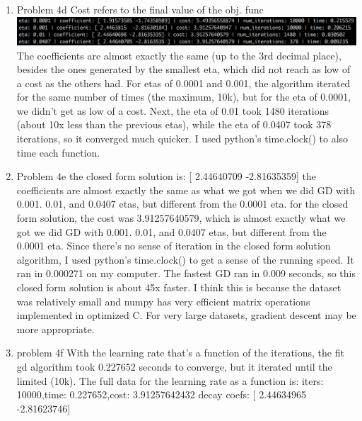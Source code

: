 \documentclass[11pt]{article}
\newcommand{\solution}[1]{{{\color{blue}{\bf Solution:} {#1}}}}
\begin{document}
\begin{enumerate}
\item Problem 4d \newline{} Cost refers to the final value of the obj. func \newline{}
\includegraphics[scale=0.55]{PS22Real.png}
\solution{The coefficients are almost exactly the same (up to the 3rd decimal place), besides the ones generated by the smallest eta, which did not reach as low of a cost as the others had. For etas of 0.0001 and 0.001, the algorithm iterated for the same number of times (the maximum, 10k), but for the eta of 0.0001, we didn't get as low of a cost. Next, the eta of 0.01 took 1480 iterations (about 10x less than the previous etas), while the eta of 0.0407 took 378 iterations, so it converged much quicker. I used python's time.clock() to also time each function.}
\vspace{1cm}
\item Problem 4e \newline{}
\solution{
the closed form solution is: [ 2.44640709 -2.81635359]
the coefficients are almost exactly the same as what we got when we did GD with 0.001. 0.01, and 0.0407 etas, but different from the 0.0001 eta. 
\newline{}
for the closed form solution, the cost was 3.91257640579, which is almost exactly what we got we did GD with 0.001. 0.01, and 0.0407 etas, but different from the 0.0001 eta.
\newline{}
Since there's no sense of iteration in the closed form solution algorithm, I used python's time.clock() to get a sense of the running speed. It ran in 0.000271 on my computer. The fastest GD ran in 0.009 seconds, so this closed form solution is about 45x faster. I think this is because the dataset was relatively small and numpy has very efficient matrix operations implemented in optimized C. For very large datasets, gradient descent may be more appropriate. 
}
\vspace{1cm}
\item problem 4f
\solution{With the learning rate that's a function of the iterations, the fit gd algorithm took 0.227652 seconds to converge, but it iterated until the limited (10k). \newline{}
The full data for the learning rate as a function is: \newline{}
iters: 10000,time: 0.227652,cost: 3.91257642432
decay coefs: [ 2.44634965 -2.81623746]
}


\end{enumerate}
\end{document}
